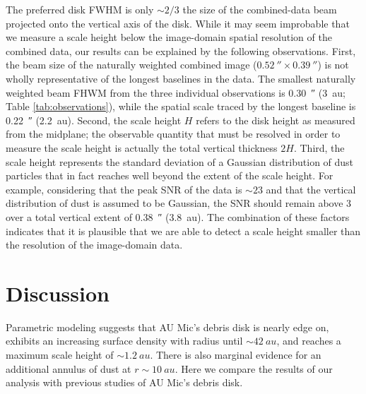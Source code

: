 \documentclass[modern]{aastex62}
\begin{document}
The preferred disk FWHM is only $\sim 2/3$ the size of the combined-data beam projected onto the vertical axis of the disk.
While it may seem improbable that we measure a scale height below the image-domain spatial resolution of the combined data, our results can be explained by the following observations.
First, the beam size of the naturally weighted combined image ($\SI{0.52}{\arcsecond} \times \SI{0.39}{\arcsecond}$) is not wholly representative of the longest baselines in the data. 
The smallest naturally weighted beam FHWM from the three individual observations is \SI{0.30}{\arcsecond} (\SI{3}{au}; Table \ref{tab:observations}), while the spatial scale traced by the longest baseline is \SI{0.22}{\arcsecond} (\SI{2.2}{au}).
Second, the scale height $H$ refers to the disk height as measured from the midplane; the observable quantity that must be resolved in order to measure the scale height is actually the total vertical thickness $2H$.
Third, the scale height represents the standard deviation of a Gaussian distribution of dust particles that in fact reaches well beyond the extent of the scale height.
For example, considering that the peak SNR of the data is $\sim 23$ and that the vertical distribution of dust is assumed to be Gaussian, the SNR should remain above 3 over a total vertical extent of \SI{0.38}{\arcsecond} (\SI{3.8}{au}). 
The combination of these factors indicates that it is plausible that we are able to detect a scale height smaller than the resolution of the image-domain data.


\section{Discussion}
\label{section: discussion}

Parametric modeling suggests that AU Mic's debris disk is nearly edge on, exhibits an increasing surface density with radius until $\sim\SI{42}{au}$, and reaches a maximum scale height of $\sim\SI{1.2}{au}$.
There is also marginal evidence for an additional annulus of dust at $r \sim \SI{10}{au}$.
Here we compare the results of our analysis with previous studies of AU Mic's debris disk.
\end{document}
